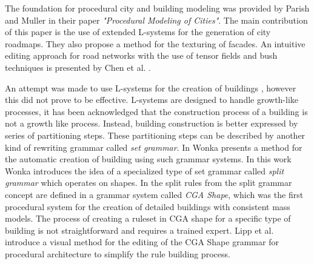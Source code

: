 \documentclass{article}
\begin{document}
The foundation for procedural city and building modeling was provided by Parish and Muller \cite{Parish01} in their paper \emph{"Procedural Modeling of Cities"}. The main contribution of this paper is the use of extended L-systems for the generation of city roadmaps. They also propose a method for the texturing of facades. An intuitive editing approach for road networks with the use of tensor fields and bush techniques is presented by Chen et al. \cite{Chen08}. 

An attempt was made to use L-systems for the creation of buildings \cite{Parish01}, however this did not prove to be effective. L-systems are designed to handle growth-like processes, it has been acknowledged that the construction process of a building is not a growth like process. Instead, building construction is better expressed by series of partitioning steps. These partitioning steps can be described by another kind of rewriting grammar called \emph{set grammar}. In \cite{Wonka03} Wonka presents a method for the automatic creation of building using such grammar systems. In this work Wonka introduces the idea of a specialized type of set grammar called \emph{split grammar} which operates on shapes. In \cite{Muller06} the split rules from the split grammar concept are defined in a grammar system called \emph{CGA Shape}, which was the first procedural system for the creation of detailed buildings with consistent mass 
models. The process of creating a ruleset in CGA shape for a specific type of building is not straightforward and requires a trained expert. Lipp et al. \cite{Lipp08} introduce a visual method for the editing of the CGA Shape grammar for procedural architecture to simplify the rule building process. 





\end{document}
